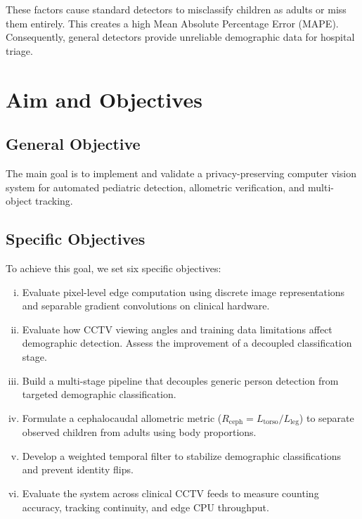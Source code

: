 These factors cause standard detectors to misclassify children as adults or miss them entirely. This creates a high Mean Absolute Percentage Error (MAPE). Consequently, general detectors provide unreliable demographic data for hospital triage.

\section{Aim and Objectives}

\subsection{General Objective}
The main goal is to implement and validate a privacy-preserving computer vision system for automated pediatric detection, allometric verification, and multi-object tracking.

\subsection{Specific Objectives}
To achieve this goal, we set six specific objectives:
\begin{enumerate}[(i)]
    \item Evaluate pixel-level edge computation using discrete image representations and separable gradient convolutions on clinical hardware.
    \item Evaluate how CCTV viewing angles and training data limitations affect demographic detection. Assess the improvement of a decoupled classification stage.
    \item Build a multi-stage pipeline that decouples generic person detection from targeted demographic classification.
    \item Formulate a cephalocaudal allometric metric ($R_{\text{ceph}} = L_{\text{torso}}/L_{\text{leg}}$) to separate observed children from adults using body proportions.
    \item Develop a weighted temporal filter to stabilize demographic classifications and prevent identity flips.
    \item Evaluate the system across clinical CCTV feeds to measure counting accuracy, tracking continuity, and edge CPU throughput.
\end{enumerate}

